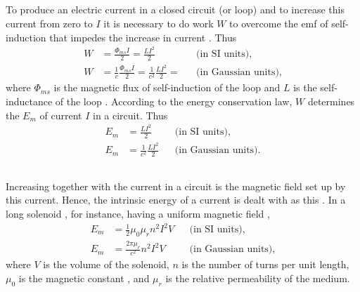 \subsection{}\label{25.4.1} To produce an electric current in a closed circuit (or loop) and to increase this current from zero to $I$ it is necessary to do work $W$ to overcome the emf of self-induction that impedes the increase in current . Thus
\begin{align*}%
W & = \frac{\Phi_{ms}I}{2} = \frac{LI^{2}}{2} && \text{(in SI units),} \\
W &  = \frac{1}{c} \frac{\Phi_{ms}I}{2} = \frac{1}{c^{2}}\frac{LI^{2}}{2} = &&  \text{(in Gaussian units),}
\end{align*}
where $\Phi_{ms}$ is the magnetic flux of self-induction of the loop  and $L$ is the self-inductance of the loop . According to the energy conservation law, $W$ determines the  $E_{m}$ of current $I$ in a circuit. Thus
\begin{align*}%
E_{m} & =  \frac{LI^{2}}{2} && \text{(in SI units),} \\
E_{m} &  =  \frac{1}{c^{2}}\frac{LI^{2}}{2} &&  \text{(in Gaussian units).}
\end{align*}

\subsection{}\label{25.4.2} Increasing together with the current in a circuit is the magnetic field set up by this current. Hence, the intrinsic energy of a current is dealt with as  this . In a long solenoid , for instance, having a uniform magnetic field ,
\begin{align*}%
E_{m} & =  \frac{1}{2} \mu_{0}\mu_{r} n^{2}I^{2}V&& \text{(in SI units),} \\
E_{m} &  =  \frac{2 \pi \mu_{r}}{c^{2}}  n^{2}I^{2}V  &&  \text{(in Gaussian units),}
\end{align*}
where $V$ is the volume of the solenoid, $n$ is the number of turns per unit length, $\mu_{0}$ is the magnetic constant , and $\mu_{r}$ is the relative permeability of the medium.

